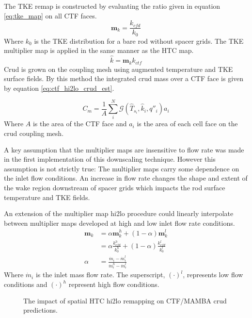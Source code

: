     The TKE remap is constructed by evaluating the ratio given in equation \ref{eq:tke_map} on all CTF faces.
    \begin{equation}
       \mathbf m_{k} = \frac{k_{cfd}}{k_{0}}
       \label{eq:tke_map}
    \end{equation}
    Where $k_0$ is the TKE distribution for a bare rod without spacer grids.
    The TKE multiplier map is applied in the same manner as the HTC map.
       \begin{equation}
       \hat k = \mathbf m_k k_{ctf}
       \end{equation}
Crud is grown on the coupling mesh using augmented temperature and TKE surface fields. By this method the integrated crud mass over a CTF face is given by equation \ref{eq:ctf_hi2lo_crud_est}.

 \begin{equation}
     C_m = \frac{1}{A} \sum_i^N \mathcal G(\hat T_{s_i}, \hat k_i, q''_i) a_i
 \label{eq:ctf_hi2lo_crud_est}
 \end{equation}
Where $A$ is the area of the CTF face and $a_i$ is the area of each cell face on the crud coupling mesh.

A key assumption that the multiplier maps are insensitive to flow rate was made in the first implementation of this downscaling technique.  However this assumption is not strictly true: The multiplier maps carry some dependence on the inlet flow conditions.  An increase in flow rate changes the shape and extent of the wake region downstream of spacer grids which impacts the rod surface temperature and TKE fields.

    An extension of the multiplier map hi2lo procedure could linearly interpolate between multiplier maps developed at high and low inlet flow rate conditions.
    \begin{align*}
        \mathbf m_k &= \alpha \mathbf m_k^h + (1 - \alpha) \mathbf m_k^l \\
                    &= \alpha \frac{k^h_{cfd}}{k^h_0} + (1 - \alpha) \frac{k^l_{cfd}}{k^l_0} \\
        \alpha & = \frac{\dot m_i - \dot m_i^l }{\dot m_i^h - \dot m_i^l}
    \end{align*}
    Where $\dot m_i$ is the inlet mass flow rate.  The superscript, $(\cdot)^l$, represents low flow conditions and $(\cdot)^h$ represent high flow conditions.


\begin{figure}[H]%
    \centering
    \qquad
    \caption[The impact of spatial HTC hi2lo remapping on CTF/MAMBA crud predictions.]{The impact of spatial HTC hi2lo remapping on CTF/MAMBA crud predictions.}%
    \label{fig:htc_remap_crud}%
\end{figure}


